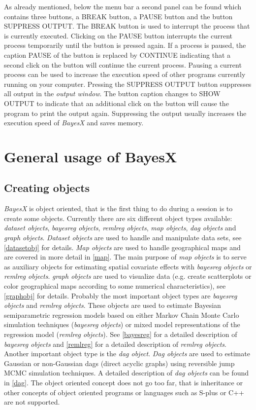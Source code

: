 As already mentioned, below the menu bar a second panel can be
found which contains three buttons, a BREAK button, a PAUSE button
and the button SUPPRESS OUTPUT. The BREAK button is used to
interrupt the process that is currently executed. Clicking on the
PAUSE button interrupts the current process temporarily until the
button is pressed again. If a process is paused, the caption PAUSE
of the button is replaced by CONTINUE indicating that a second
click on the button will continue the current process. Pausing a
current process can be used to increase the execution speed of
other programs currently running on your computer. Pressing the
SUPPRESS OUTPUT button suppresses all output in the {\em output window}.
The button caption changes to SHOW OUTPUT to indicate that an
additional click on the button will cause the  program to print
the output again. Suppressing the output usually increases the
execution speed of {\em BayesX} and saves memory.


\section{General usage of BayesX}
\label{generalusage}

\subsection{Creating objects}
\label{createobject}

  {\em BayesX} is object
oriented, that is the first thing to do during a session is to
create some objects. Currently there are six different object
types available: {\em dataset objects}, {\em bayesreg objects},
{\em remlreg objects}, {\em map objects}, {\em dag objects} and {\em
graph objects}. {\em Dataset objects} are used to handle and
manipulate data sets, see \autoref{datasetobj} for details. {\em Map
objects} are used to handle geographical maps and are covered in
more detail in \autoref{map}. The main purpose of {\em map objects} is
to serve as auxiliary objects for estimating spatial covariate
effects with {\em bayesreg objects} or {\em remlreg objects}. {\em
graph objects} are used to visualize data (e.g. create
scatterplots or color geographical maps according to some
numerical characteristics), see \autoref{graphobj} for details.
Probably the most important object types are {\em bayesreg
objects} and {\em remlreg objects}. These objects are used to
estimate Bayesian semiparametric regression models based on either
Markov Chain Monte Carlo simulation techniques ({\em bayesreg
objects}) or mixed model representations of the regression model
({\em remlreg objects}). See \autoref{bayesreg} for a detailed
description of {\em bayesreg objects} and \autoref{remlreg} for a
detailed description of {\em remlreg objects}. Another important
object type is the {\em dag object}. {\em Dag objects} are used to
estimate Gaussian or non-Gaussian dags (direct acyclic graphs)
using reversible jump MCMC simulation techniques. A detailed
description of {\em dag objects} can be found in \autoref{dag}.
The object oriented concept does not go too far, that is
inheritance or other concepts of object oriented programs or
languages such as S-plus or C++ are not supported.

